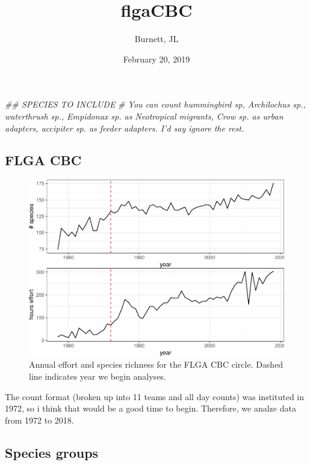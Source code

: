 \documentclass[]{article}
\title{flgaCBC}
\author{Burnett, JL}
\date{February 20, 2019}
\newenvironment{Shaded}{\begin{snugshade}}{\end{snugshade}}
\newcommand{\CommentTok}[1]{\textcolor[rgb]{0.56,0.35,0.01}{\textit{#1}}}
\begin{document}
\maketitle

\begin{Shaded}
\begin{Highlighting}[]
\CommentTok{## SPECIES TO INCLUDE}
\CommentTok{# You can count hummingbird sp, Archilochus sp., waterthrush sp., Empidonax sp. as Neotropical migrants,   Crow sp. as urban adapters, accipiter sp. as feeder adapters. I'd say ignore the rest.   }
\end{Highlighting}
\end{Shaded}

\hypertarget{flga-cbc}{%
\subsection{FLGA CBC}\label{flga-cbc}}

\begin{figure}
\centering
\includegraphics{runThrough_files/figure-latex/effortPlots-1.pdf}
\caption{Annual effort and species richness for the FLGA CBC circle.
Dashed line indicates year we begin analyses.}
\end{figure}

The count format (broken up into 11 teams and all day counts) was
instituted in 1972, so i think that would be a good time to begin.
Therefore, we analze data from 1972 to 2018.

\hypertarget{species-groups}{%
\subsection{Species groups}\label{species-groups}}
\end{document}
